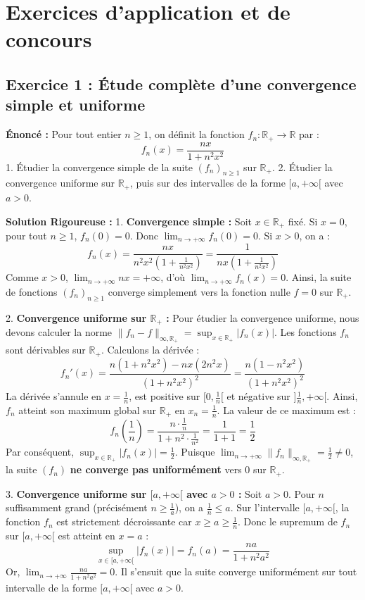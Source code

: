 \documentclass[11pt,a4paper]{article}
\begin{document}
\section{Exercices d'application et de concours}

\subsection*{Exercice 1 : Étude complète d'une convergence simple et uniforme}
\textbf{Énoncé :}
Pour tout entier $n \ge 1$, on définit la fonction $f_n : \mathbb{R}_+ \to \mathbb{R}$ par :
$$f_n(x) = \frac{nx}{1 + n^2 x^2}$$
1. Étudier la convergence simple de la suite $(f_n)_{n \ge 1}$ sur $\mathbb{R}_+$.
2. Étudier la convergence uniforme sur $\mathbb{R}_+$, puis sur des intervalles de la forme $[a, +\infty[$ avec $a > 0$.

\textbf{Solution Rigoureuse :}
1. \textbf{Convergence simple :}
Soit $x \in \mathbb{R}_+$ fixé.
Si $x = 0$, pour tout $n \ge 1$, $f_n(0) = 0$. Donc $\lim_{n \to +\infty} f_n(0) = 0$.
Si $x > 0$, on a :
$$f_n(x) = \frac{nx}{n^2 x^2(1 + \frac{1}{n^2 x^2})} = \frac{1}{nx(1 + \frac{1}{n^2 x^2})}$$
Comme $x > 0$, $\lim_{n \to +\infty} nx = +\infty$, d'où $\lim_{n \to +\infty} f_n(x) = 0$.
Ainsi, la suite de fonctions $(f_n)_{n \ge 1}$ converge simplement vers la fonction nulle $f = 0$ sur $\mathbb{R}_+$.

2. \textbf{Convergence uniforme sur $\mathbb{R}_+$ :}
Pour étudier la convergence uniforme, nous devons calculer la norme $\|f_n - f\|_{\infty, \mathbb{R}_+} = \sup_{x \in \mathbb{R}_+} |f_n(x)|$.
Les fonctions $f_n$ sont dérivables sur $\mathbb{R}_+$. Calculons la dérivée :
$$f_n'(x) = \frac{n(1 + n^2 x^2) - nx(2n^2 x)}{(1 + n^2 x^2)^2} = \frac{n(1 - n^2 x^2)}{(1 + n^2 x^2)^2}$$
La dérivée s'annule en $x = \frac{1}{n}$, est positive sur $[0, \frac{1}{n}[$ et négative sur $]\frac{1}{n}, +\infty[$.
Ainsi, $f_n$ atteint son maximum global sur $\mathbb{R}_+$ en $x_n = \frac{1}{n}$.
La valeur de ce maximum est :
$$f_n\left(\frac{1}{n}\right) = \frac{n \cdot \frac{1}{n}}{1 + n^2 \cdot \frac{1}{n^2}} = \frac{1}{1 + 1} = \frac{1}{2}$$
Par conséquent, $\sup_{x \in \mathbb{R}_+} |f_n(x)| = \frac{1}{2}$.
Puisque $\lim_{n \to +\infty} \|f_n\|_{\infty, \mathbb{R}_+} = \frac{1}{2} \neq 0$, la suite $(f_n)$ \textbf{ne converge pas uniformément} vers $0$ sur $\mathbb{R}_+$.

3. \textbf{Convergence uniforme sur $[a, +\infty[$ avec $a > 0$ :}
Soit $a > 0$. Pour $n$ suffisamment grand (précisément $n \ge \frac{1}{a}$), on a $\frac{1}{n} \le a$.
Sur l'intervalle $[a, +\infty[$, la fonction $f_n$ est strictement décroissante car $x \ge a \ge \frac{1}{n}$.
Donc le supremum de $f_n$ sur $[a, +\infty[$ est atteint en $x = a$ :
$$\sup_{x \in [a, +\infty[} |f_n(x)| = f_n(a) = \frac{na}{1 + n^2 a^2}$$
Or, $\lim_{n \to +\infty} \frac{na}{1 + n^2 a^2} = 0$.
Il s'ensuit que la suite converge uniformément sur tout intervalle de la forme $[a, +\infty[$ avec $a > 0$.
\end{document}
